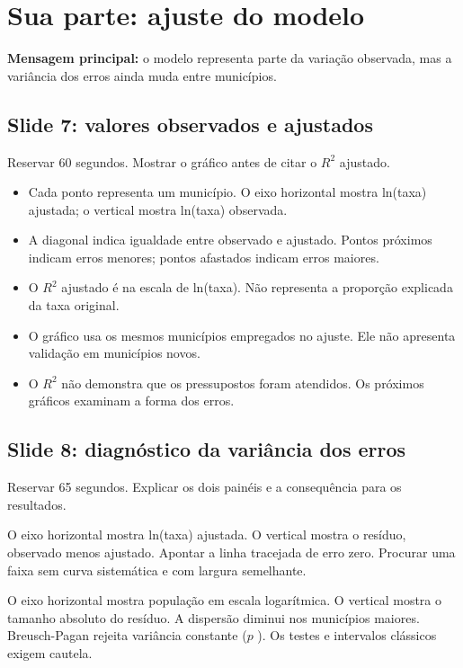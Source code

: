 \section{Sua parte: ajuste do modelo}
\textbf{Mensagem principal:} o modelo representa parte da variação observada, mas a variância dos erros ainda muda entre municípios.
\subsection{Slide 7: valores observados e ajustados}
Reservar 60 segundos. Mostrar o gráfico antes de citar o $R^2$ ajustado.
\begin{itemize}
\item Cada ponto representa um município. O eixo horizontal mostra ln(taxa) ajustada; o vertical mostra ln(taxa) observada.
\item A diagonal indica igualdade entre observado e ajustado. Pontos próximos indicam erros menores; pontos afastados indicam erros maiores.
\item O $R^2$ ajustado é \nRdoisA{} na escala de ln(taxa). Não representa a proporção explicada da taxa original.
\item O gráfico usa os mesmos municípios empregados no ajuste. Ele não apresenta validação em municípios novos.
\item O $R^2$ não demonstra que os pressupostos foram atendidos. Os próximos gráficos examinam a forma dos erros.
\end{itemize}
\subsection{Slide 8: diagnóstico da variância dos erros}
Reservar 65 segundos. Explicar os dois painéis e a consequência para os resultados.
\begin{description}[leftmargin=0pt]
\item[Resíduos e ajuste, à esquerda.] O eixo horizontal mostra ln(taxa) ajustada. O vertical mostra o resíduo, observado menos ajustado. Apontar a linha tracejada de erro zero. Procurar uma faixa sem curva sistemática e com largura semelhante.
\item[Erro e população, à direita.] O eixo horizontal mostra população em escala logarítmica. O vertical mostra o tamanho absoluto do resíduo. A dispersão diminui nos municípios maiores. Breusch-Pagan rejeita variância constante ($p$ \nBPp). Os testes e intervalos clássicos exigem cautela.
\end{description}

